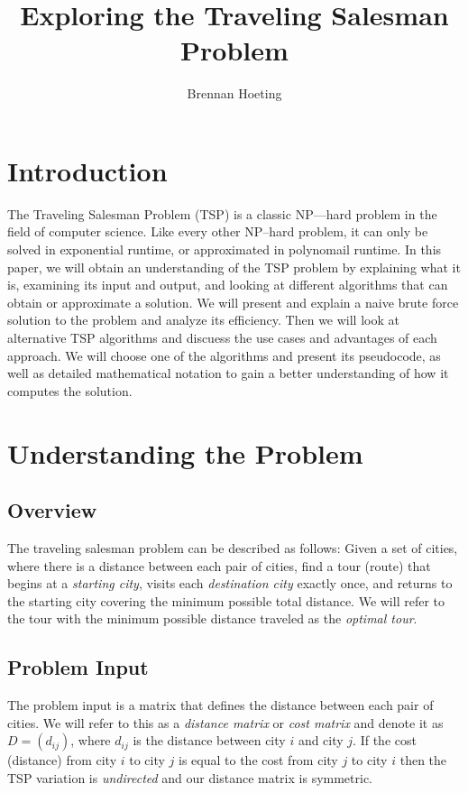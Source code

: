 \documentclass[11pt,fleqn]{article}
\begin{document}
\title{Exploring the Traveling Salesman Problem}
\author{Brennan Hoeting}
\date{}
\maketitle

\section*{Introduction}
The Traveling Salesman Problem (TSP) is a classic NP---hard problem
in the field of computer science.  Like every other NP--hard problem,
it can only be solved in exponential runtime, or approximated in polynomail
runtime.  In this paper, we will obtain an understanding of the TSP problem
by explaining what it is, examining its input and output, and looking at
different algorithms that can obtain or approximate a solution.  We will
present and explain a naive brute force solution to the problem and analyze
its efficiency.  Then we will look at alternative TSP algorithms and discuess
the use cases and advantages of each approach.  We will choose one of the
algorithms and present its pseudocode, as well as detailed mathematical
notation to gain a better understanding of how it computes the solution.

\section{Understanding the Problem}
\subsection{Overview}
The traveling salesman problem can be described as follows:
Given a set of cities, where there is a distance between
each pair of cities, find a tour (route) that begins at a
\textit{starting city}, visits each \textit{destination city}
exactly once, and returns to the starting city covering the minimum
possible total distance.  We will refer to the tour with the
minimum possible distance traveled as the \textit{optimal tour}.

\subsection{Problem Input}
The problem input is a matrix that defines the distance
between each pair of cities.  We will refer to this as
a \textit{distance matrix} or \textit{cost matrix} and denote
it as $D = (d_{ij})$, where $d_{ij}$ is the distance between city
$i$ and city $j$.  If the cost (distance) from city $i$ to city $j$
is equal to the cost from city $j$ to city $i$ then the TSP variation
is \textit{undirected} and our distance matrix is symmetric.
\par
\end{document}
